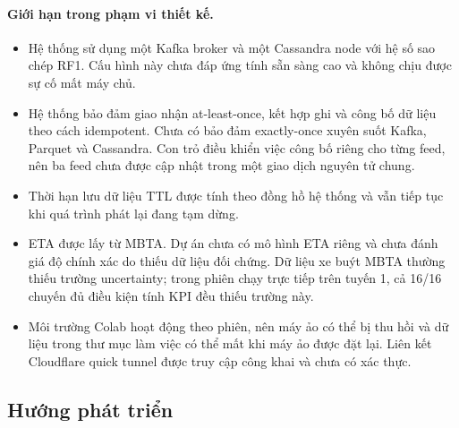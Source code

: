 \paragraph{Giới hạn trong phạm vi thiết kế.}
\begin{itemize}
    \item Hệ thống sử dụng một Kafka broker và một Cassandra node với hệ số sao chép RF1. Cấu hình này chưa đáp ứng tính sẵn sàng cao và không chịu được sự cố mất máy chủ.
    \item Hệ thống bảo đảm giao nhận at-least-once, kết hợp ghi và công bố dữ liệu theo cách idempotent. Chưa có bảo đảm exactly-once xuyên suốt Kafka, Parquet và Cassandra. Con trỏ điều khiển việc công bố riêng cho từng feed, nên ba feed chưa được cập nhật trong một giao dịch nguyên tử chung.
    \item Thời hạn lưu dữ liệu TTL được tính theo đồng hồ hệ thống và vẫn tiếp tục khi quá trình phát lại đang tạm dừng.
    \item ETA được lấy từ MBTA. Dự án chưa có mô hình ETA riêng và chưa đánh giá độ chính xác do thiếu dữ liệu đối chứng. Dữ liệu xe buýt MBTA thường thiếu trường uncertainty; trong phiên chạy trực tiếp trên tuyến 1, cả 16/16 chuyến đủ điều kiện tính KPI đều thiếu trường này.
    \item Môi trường Colab hoạt động theo phiên, nên máy ảo có thể bị thu hồi và dữ liệu trong thư mục làm việc có thể mất khi máy ảo được đặt lại. Liên kết Cloudflare quick tunnel được truy cập công khai và chưa có xác thực.
\end{itemize}

\subsection{Hướng phát triển}

